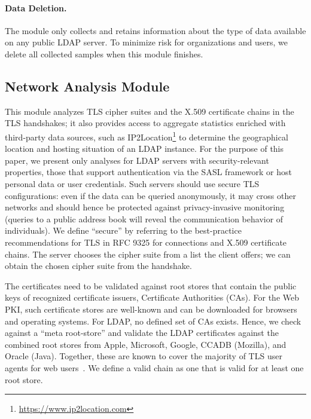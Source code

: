 \paragraph{Data Deletion.}
The module only collects and retains information about the type of data available on any public LDAP server. To minimize risk for organizations and users, we delete all collected samples when this module finishes.


\subsection{Network Analysis Module}
\label{subsec:methodology_tls_certs}

This module analyzes \acrshort{TLS} cipher suites and the X.509 certificate chains in the \acrshort{TLS} handshakes; it also provides access to aggregate statistics enriched with third-party data sources, such as IP2Location\footnote{\url{https://www.ip2location.com}} to determine the geographical location and hosting situation of an \acrshort{LDAP} instance. For the purpose of this paper, we present only analyses for \acrshort{LDAP} servers with security-relevant properties, \eg those that support authentication via the \acrlong{SASL} framework or host personal data or user credentials. Such servers should use secure \acrshort{TLS} configurations: even if the data can be queried anonymously, it may cross other networks and should hence be protected against privacy-invasive monitoring (\eg queries to a public address book will reveal the communication behavior of individuals). We define ``secure'' by referring to the best-practice recommendations for \acrshort{TLS} in RFC 9325 \cite{rfc9325} for connections and X.509 certificate chains.
The server chooses the cipher suite from a list the client offers; we can obtain the chosen cipher suite from the handshake.

The certificates need to be validated against root stores that contain the public keys of recognized certificate issuers, \ie Certificate Authorities (CAs). For the Web PKI, such certificate stores are well-known and can be downloaded for browsers and operating systems. For \acrshort{LDAP}, no defined set of CAs exists. Hence, we check against a ``meta root-store'' and validate the \acrshort{LDAP} certificates against the combined root stores from Apple, Microsoft, Google, CCADB (Mozilla), and Oracle (Java). Together, these are known to cover the majority of \acrshort{TLS} user agents for web users~\cite{maTracingYourRoots2021}. We define a valid chain as one that is valid for at least one root store.

